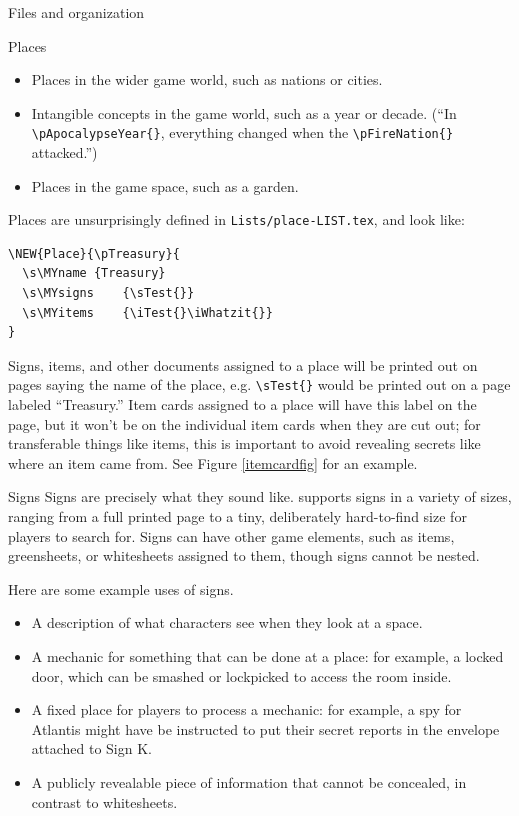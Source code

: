 \documentclass[sheet]{GameTexBase}
\begin{document}
\begin{section}{Files and organization}
\begin{subsection}{Places}
\begin{itemize}
\item Places in the wider game world, such as nations or cities.
\item Intangible concepts in the game world, such as a year or decade.  (``In \lstinline|\pApocalypseYear{}|, everything changed when the \lstinline|\pFireNation{}| attacked.'')
\item Places in the game space, such as a garden.  
\end{itemize}

Places are unsurprisingly defined in \lstinline|Lists/place-LIST.tex|, and look like:
\begin{verbatim}
\NEW{Place}{\pTreasury}{
  \s\MYname	{Treasury}
  \s\MYsigns	{\sTest{}}
  \s\MYitems	{\iTest{}\iWhatzit{}}
}
\end{verbatim}

Signs, items, and other documents assigned to a place will be printed out on pages saying the name of the place, e.g. \lstinline|\sTest{}| would be printed out on a page labeled ``Treasury.'' 
Item cards assigned to a place will have this label on the page, but it won't be on the individual item cards when they are cut out; for transferable things like items, this is important to avoid revealing secrets like where an item came from.  See Figure \ref{itemcardfig} for an example.
\end{subsection}
\begin{subsection}{Signs}
Signs are precisely what they sound like.  \gametex{} supports signs in a variety of sizes, ranging from a full printed page to a tiny, deliberately hard-to-find size for players to search for.
Signs can have other game elements, such as items, greensheets, or whitesheets assigned to them, though signs cannot be nested.

Here are some example uses of signs.
\begin{itemize}
\item A description of what characters see when they look at a space.
\item A mechanic for something that can be done at a place: for example, a locked door, which can be smashed or lockpicked to access the room inside.
\item A fixed place for players to process a mechanic: for example, a spy for Atlantis might have be instructed to put their secret reports in the envelope attached to Sign K.
\item A publicly revealable piece of information that cannot be concealed, in contrast to whitesheets.
\end{itemize}


\end{subsection}
\end{section}
\end{document}
